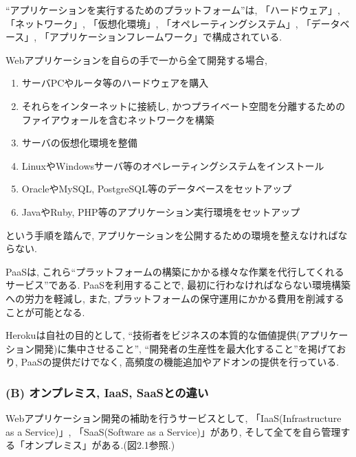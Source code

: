 “アプリケーションを実行するためのプラットフォーム”は, 「ハードウェア」, 「ネットワーク」, 「仮想化環境」, 「オペレーティングシステム」, 「データベース」, 「アプリケーションフレームワーク」で構成されている.

Webアプリケーションを自らの手で一から全て開発する場合,
\begin{enumerate}
\item サーバPCやルータ等のハードウェアを購入

\item それらをインターネットに接続し, かつプライベート空間を分離するためのファイアウォールを含むネットワークを構築

\item サーバの仮想化環境を整備

\item LinuxやWindowsサーバ等のオペレーティングシステムをインストール

\item OracleやMySQL, PostgreSQL等のデータベースをセットアップ

\item JavaやRuby, PHP等のアプリケーション実行環境をセットアップ
\end{enumerate}

という手順を踏んで, アプリケーションを公開するための環境を整えなければならない.

PaaSは, これら“プラットフォームの構築にかかる様々な作業を代行してくれるサービス”である.
PaaSを利用することで, 最初に行わなければならない環境構築への労力を軽減し, また, プラットフォームの保守運用にかかる費用を削減することが可能となる.

Herokuは自社の目的として, “技術者をビジネスの本質的な価値提供(アプリケーション開発)に集中させること”, “開発者の生産性を最大化すること”を掲げており, PaaSの提供だけでなく, 高頻度の機能追加やアドオンの提供を行っている.

\subsubsection{(B) オンプレミス, IaaS, SaaSとの違い}
Webアプリケーション開発の補助を行うサービスとして, 「IaaS(Infrastructure as a Service)」, 「SaaS(Software as a Service)」があり, そして全てを自ら管理する「オンプレミス」がある.(図2.1参照.)

